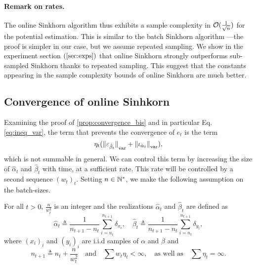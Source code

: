\paragraph{Remark on rates.} The online Sinkhorn algorithm thus exhibits a sample complexity in
$\mathcal{O}(\frac{1}{\sqrt{n}})$ for the potential estimation. This is similar to the
batch Sinkhorn algorithm \citep{2019-Genevay-aistats}---the proof is simpler in our case, but we
assume repeated sampling.
We show in the experiment section $(\autoref{sec:exps})$ that online Sinkhorn
strongly outperforms sub-sampled Sinkhorn thanks to repeated sampling. This suggest that the constants appearing in the sample complexity bounds of online Sinkhorn are much better.

\subsection{Convergence of online Sinhkorn}

Examining the proof of \autoref{prop:convergence_bis} and in particular Eq. \eqref{eq:ineq_var}, the term that prevents the convergence of $e_t$ is the term
\begin{equation}
    \eta_t ({\Vert \varepsilon_{\hat \beta_t} \Vert}_{\text{\upshape var}} + 
    {\Vert \iota_{\hat \alpha_t} \Vert}_{\text{\upshape var}}),
\end{equation}
which is not summable in general.
We can control this term by increasing the  size of $\hat \alpha_t$ and $\hat
 \beta_t$ with time, at a sufficient rate. This rate will be controlled by a second
 sequence ${(w_t)}_t$. Setting $n \in \mathbb{N}^*$, we
 make the following assumption on the batch-sizes.

\begin{assumption}\label{ass:double_weights}
    For all $t > 0$, $\frac{n}{w_t^2}$ is an integer and the realizations
    $\hat \alpha_t$ and $\hat \beta_t$ are defined as
    \begin{equation}
         \hat \alpha_t \triangleq \frac{1}{n_{t+1} - n_t} \sum_{i=n_t}^{n_{t+1}} \delta_{x_i},
         \quad
         \hat \beta_t \triangleq \frac{1}{n_{t+1} - n_t} \sum_{i=n_t}^{n_{t+1}} \delta_{y_i},
    \end{equation}
where $(x_i)_i$ and $(y_i)_i$ are i.i.d samples of $\alpha$ and $\beta$ and
\begin{equation}
    n_{t+1} \triangleq n_t + \frac{n}{w_t^2}\quad\text{and}\quad \sum w_t
     \eta_t < \infty,\quad\text{as well as}\quad \sum \eta_t = \infty.
\end{equation}
\end{assumption}

